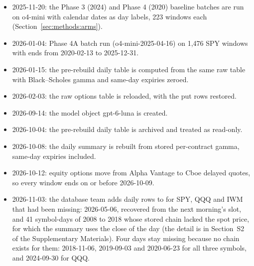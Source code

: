 \begin{itemize}
\item 2025-11-20: the Phase 3 (2024) and Phase 4 (2020) baseline batches are run on o4-mini with calendar dates as day labels, 223 windows each (Section~\ref{sec:methods:arms}).
\item 2026-01-04: Phase 4A batch run (o4-mini-2025-04-16) on 1{,}476 SPY windows with ends from 2020-02-13 to 2025-12-31.
\item 2026-01-15: the pre-rebuild daily table is computed from the same raw table with Black--Scholes gamma and same-day expiries zeroed.
\item 2026-02-03: the raw options table is reloaded, with the put rows restored.
\item 2026-09-14: the model object gpt-6-luna is created.
\item 2026-10-04: the pre-rebuild daily table is archived and treated as read-only.
\item 2026-10-08: the daily summary is rebuilt from stored per-contract gamma, same-day expiries included.
\item 2026-10-12: equity options move from Alpha Vantage to Cboe delayed quotes, so every window ends on or before 2026-10-09.
\item 2026-11-03: the database team adds daily rows to  for SPY, QQQ and IWM that had been missing: 2026-05-06, recovered from the next morning's slot, and 41 symbol-days of 2008 to 2018 whose stored chain lacked the spot price, for which the summary uses the close of the day (the detail is in Section~S2 of the Supplementary Materials). Four days stay missing because no chain exists for them: 2018-11-06, 2019-09-03 and 2020-06-23 for all three symbols, and 2024-09-30 for QQQ.
\end{itemize}
